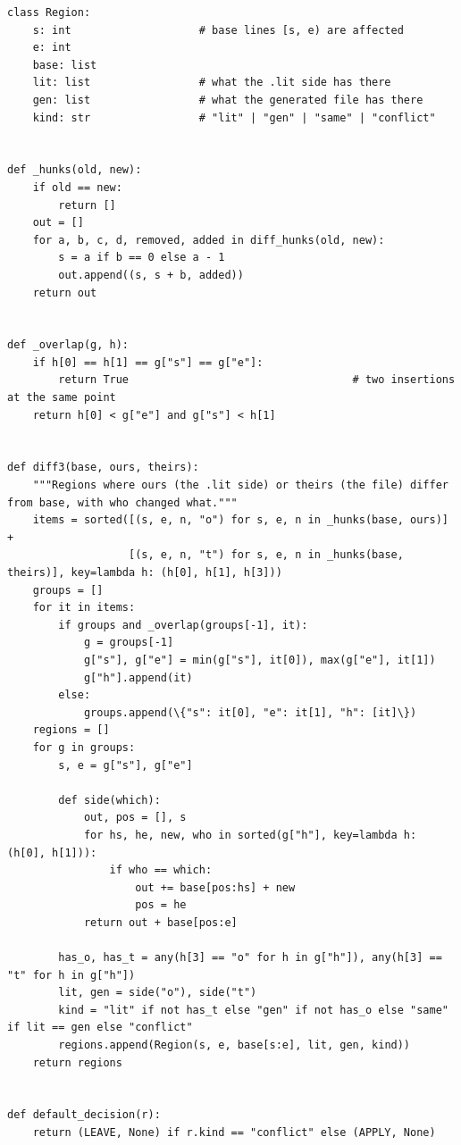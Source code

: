 \documentclass[10pt,a4paper]{article}
\begin{document}
\begin{Verbatim}
class Region:
    s: int                    # base lines [s, e) are affected
    e: int
    base: list
    lit: list                 # what the .lit side has there
    gen: list                 # what the generated file has there
    kind: str                 # "lit" | "gen" | "same" | "conflict"


def _hunks(old, new):
    if old == new:
        return []
    out = []
    for a, b, c, d, removed, added in diff_hunks(old, new):
        s = a if b == 0 else a - 1
        out.append((s, s + b, added))
    return out


def _overlap(g, h):
    if h[0] == h[1] == g["s"] == g["e"]:
        return True                                   # two insertions at the same point
    return h[0] < g["e"] and g["s"] < h[1]


def diff3(base, ours, theirs):
    """Regions where ours (the .lit side) or theirs (the file) differ from base, with who changed what."""
    items = sorted([(s, e, n, "o") for s, e, n in _hunks(base, ours)] +
                   [(s, e, n, "t") for s, e, n in _hunks(base, theirs)], key=lambda h: (h[0], h[1], h[3]))
    groups = []
    for it in items:
        if groups and _overlap(groups[-1], it):
            g = groups[-1]
            g["s"], g["e"] = min(g["s"], it[0]), max(g["e"], it[1])
            g["h"].append(it)
        else:
            groups.append(\{"s": it[0], "e": it[1], "h": [it]\})
    regions = []
    for g in groups:
        s, e = g["s"], g["e"]

        def side(which):
            out, pos = [], s
            for hs, he, new, who in sorted(g["h"], key=lambda h: (h[0], h[1])):
                if who == which:
                    out += base[pos:hs] + new
                    pos = he
            return out + base[pos:e]

        has_o, has_t = any(h[3] == "o" for h in g["h"]), any(h[3] == "t" for h in g["h"])
        lit, gen = side("o"), side("t")
        kind = "lit" if not has_t else "gen" if not has_o else "same" if lit == gen else "conflict"
        regions.append(Region(s, e, base[s:e], lit, gen, kind))
    return regions


def default_decision(r):
    return (LEAVE, None) if r.kind == "conflict" else (APPLY, None)
\end{Verbatim}
\end{document}
